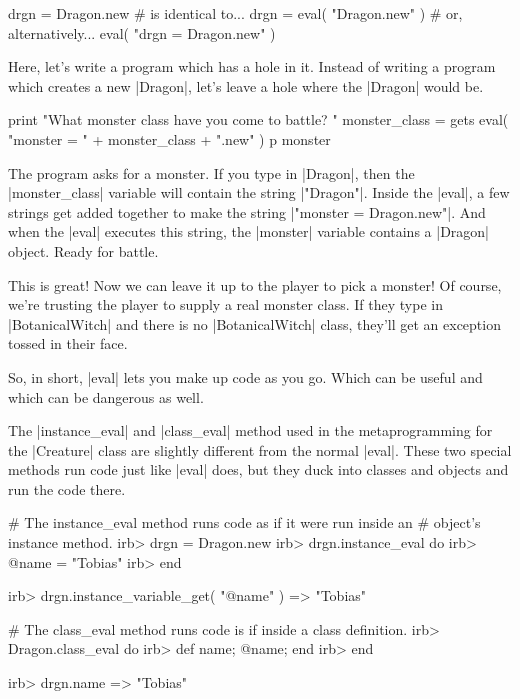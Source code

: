 \documentclass[12pt,twoside]{report}
\begin{document}
\begin{rubycode}

 drgn = Dragon.new
 # is identical to...
 drgn = eval( "Dragon.new" )
 # or, alternatively...
 eval( "drgn = Dragon.new" )

\end{rubycode}


Here, let's write a program which has a hole in it.  Instead of
writing a program which creates a new
\rubyinline|Dragon|, let's leave a hole where the
\rubyinline|Dragon| would be.


\begin{rubycode}

 print "What monster class have you come to battle? "
 monster_class = gets
 eval( "monster = " + monster_class + ".new" )
 p monster

\end{rubycode}


The program asks for a monster.  If you type in
\rubyinline|Dragon|, then the
\rubyinline|monster_class| variable will contain the
string \rubyinline|"Dragon"|.  Inside the
\rubyinline|eval|, a few strings get added together to
make the string \rubyinline|"monster = Dragon.new"|.
And when the \rubyinline|eval| executes this string,
the \rubyinline|monster| variable contains a
\rubyinline|Dragon| object.  Ready for battle.

This is great!  Now we can leave it up to the player to pick a
monster!  Of course, we're trusting the player to supply a real
monster class.  If they type in
\rubyinline|BotanicalWitch| and there is no
\rubyinline|BotanicalWitch| class, they'll get an
exception tossed in their face.

So, in short, \rubyinline|eval| lets you make up code
as you go.  Which can be useful and which can be dangerous as well.

The \rubyinline|instance_eval| and
\rubyinline|class_eval| method used in the
metaprogramming for the \rubyinline|Creature| class
are slightly different from the normal
\rubyinline|eval|.  These two special methods run code
just like \rubyinline|eval| does, but they duck into
classes and objects and run the code there.


\begin{consolecode}

 # The instance_eval method runs code as if it were run inside an
 # object's instance method.
 irb> drgn = Dragon.new
 irb> drgn.instance_eval do
 irb>   @name = "Tobias"
 irb> end

 irb> drgn.instance_variable_get( "@name" )
   => "Tobias"

 # The class_eval method runs code is if inside a class definition.
 irb> Dragon.class_eval do
 irb>   def name; @name; end
 irb> end

 irb> drgn.name
   => "Tobias"

\end{consolecode}
\end{document}
